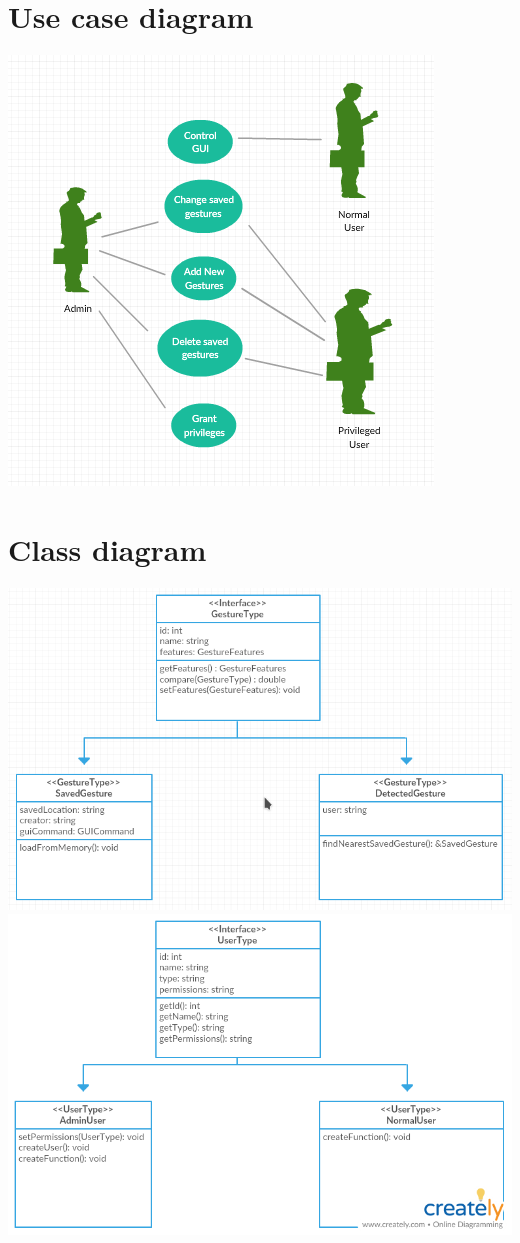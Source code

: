 \documentclass{scrreprt}
\begin{document}
\section{Use case diagram}
\begin{center}
    \includegraphics{usecase.png}
\end{center}
\section{Class diagram}
\begin{center}
    \includegraphics[scale=0.8]{classdiagram.png}
    \includegraphics[scale=0.8]{UserClass.png}
\end{center}
\end{document}
